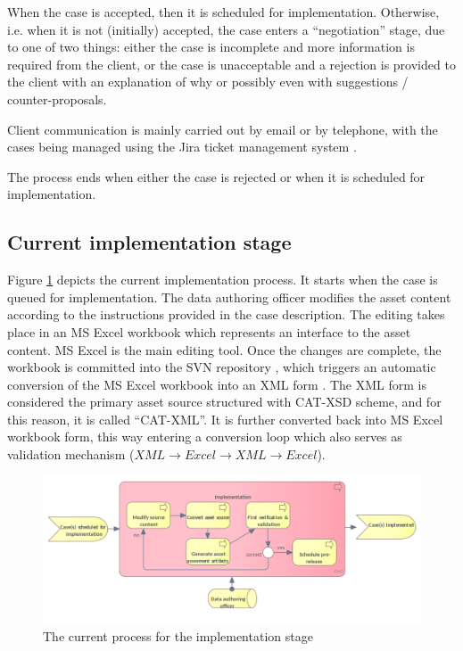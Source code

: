 	
	When the case is accepted, then it is scheduled for implementation. Otherwise, i.e. when it is not (initially) accepted, the case enters a ``negotiation'' stage, due to one of two things: either the case is incomplete and more information is required from the client, or the case is unacceptable and a rejection is provided to the client with an explanation of why or possibly even with suggestions / counter-proposals. 
	
	Client communication is mainly carried out by email or by telephone, with the cases being managed using the Jira ticket management system \citep{jira}. 
	
	The process ends when either the case is rejected or when it is scheduled for implementation. 

	
	\subsection{Current implementation stage}
	\label{sec:implementation-current}
		
	Figure \ref{fig:implementation-current} depicts the current implementation process. It starts when the case is queued for implementation. The data authoring officer modifies the asset content according to the instructions provided in the case description. The editing takes place in an MS Excel \citep{excel} workbook which represents an interface to the asset content. MS Excel is the main editing tool. Once the changes are complete, the workbook is committed into the SVN repository \citep{svn}, which triggers an automatic conversion of the MS Excel workbook into an XML form \cite{xml11-spec}. The XML form is considered the primary asset source structured with CAT-XSD scheme, and for this reason, it is called ``CAT-XML''. It is further converted back into MS Excel workbook form, this way entering a conversion loop which also serves as validation mechanism ($XML \rightarrow Excel \rightarrow XML \rightarrow Excel$).
	
	\begin{figure}[h]
		\centering
		\includegraphics[width=.9\textwidth]{images/business/current/Implementation.png}
		\caption{The current process for the implementation stage}
		\label{fig:implementation-current}
	\end{figure}
	
